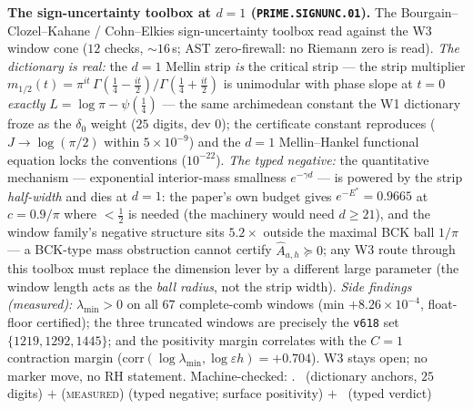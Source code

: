\documentclass[11pt,a4paper]{article}
\theoremstyle{definition}
\begin{document}
\par\smallskip\noindent\textbf{The sign-uncertainty toolbox at $d=1$
(\texttt{PRIME.SIGNUNC.01}).}
The Bourgain--Clozel--Kahane / Cohn--Elkies sign-uncertainty toolbox
read against the W3 window cone ($12$ checks, ${\sim}16$\,s; AST
zero-firewall: no Riemann zero is read).  \emph{The dictionary is
real:} the $d=1$ Mellin strip \emph{is} the critical strip --- the
strip multiplier
$m_{1/2}(t)=\pi^{it}\,\Gamma(\tfrac14-\tfrac{it}2)/\Gamma(\tfrac14+\tfrac{it}2)$
is unimodular with phase slope at $t=0$ \emph{exactly}
$L=\log\pi-\psi(\tfrac14)$ --- the same archimedean constant the W1
dictionary froze as the $\delta_0$ weight ($25$ digits, dev $0$); the
certificate constant reproduces ($J\to\log(\pi/2)$ within
$5\times10^{-9}$) and the $d=1$ Mellin--Hankel functional equation
locks the conventions ($10^{-22}$).  \emph{The typed negative:} the
quantitative mechanism --- exponential interior-mass smallness
$e^{-\gamma d}$ --- is powered by the strip \emph{half-width} and dies
at $d=1$: the paper's own budget gives $e^{-E^*}=0.9665$ at
$c=0.9/\pi$ where $<\tfrac12$ is needed (the machinery would need
$d\ge21$), and the window family's negative structure sits
$5.2\times$ outside the maximal BCK ball $1/\pi$ --- a BCK-type mass
obstruction cannot certify $\widehat A_{a,h}\succeq0$; any W3 route
through this toolbox must replace the dimension lever by a different
large parameter (the window length acts as the \emph{ball radius},
not the strip width).  \emph{Side findings (measured):}
$\lambda_{\min}>0$ on all $67$ complete-comb windows (min
$+8.26\times10^{-4}$, float-floor certified); the three truncated
windows are precisely the \texttt{v618} set $\{1219,1292,1445\}$; and
the positivity margin correlates with the $C=1$ contraction margin
($\mathrm{corr}(\log\lambda_{\min},\log\varepsilon h)=+0.704$).  W3
stays open; no marker move, no RH statement.
Machine-checked: .
\mE\ (dictionary anchors, $25$ digits) $+$ (\textsc{measured}) (typed
negative; surface positivity) $+$ \mC\ (typed verdict)
\par\smallskip
\end{document}
